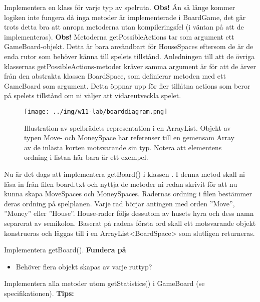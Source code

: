 \Subtask Implementera en klass för varje typ av spelruta. 
\newline
\newline
\noindent
\textbf{Obs!} Än så länge kommer logiken inte fungera då inga metoder är implementerade i BoardGame, det går trots detta bra att anropa metoderna utan kompileringsfel (i väntan på att de implementeras).
\newline
\newline
\noindent
\textbf{Obs!} Metoderna getPossibleActions tar som argument ett GameBoard-objekt. Detta är bara användbart för HouseSpaces eftersom de är de enda rutor som behöver känna till spelets tillstånd. Anledningen till att de övriga klassernas getPossibleActions-metoder kräver samma argument är för att de ärver från den abstrakta klassen BoardSpace, som definierar metoden med ett GameBoard som argument. Detta öppnar upp för fler tillåtna actions som beror på spelets tillstånd om ni väljer att vidareutveckla spelet.


\begin{figure}[H]
\centering
\texttt{[image: ../img/w11-lab/boarddiagram.png]}
\caption { Illustration av spelbrädets representation i en ArrayList. Objekt av typen Move- och MoneySpace har referenser till en gemensam Array av de inlästa korten motsvarande sin typ. Notera att elementens ordning i listan här bara är ett exempel.}
\label{fig:scalajava:lthopoly-team:boarddiagram}
\end{figure}

\Task Nu är det dags att implementera getBoard() i klassen . I denna metod skall ni läsa in från filen board.txt och nyttja de metoder ni redan skrivit för att nu kunna skapa MoveSpaces och MoneySpaces. Radernas ordning i filen bestämmer deras ordning på spelplanen. Varje rad börjar antingen med orden ''Move'', ''Money'' eller ''House''. House-rader följs dessutom av husets hyra och dess namn separerat av semikolon. Baserat på radens första ord skall ett motsvarande objekt konstrueras och läggas till i en ArrayList<BoardSpace> som slutligen returneras.

\Subtask Implementera getBoard().
\newline
\newline
\textbf{Fundera på}
\begin{itemize}
\item Behöver flera objekt skapas av varje ruttyp?
\end{itemize}

\Task Implementera alla metoder utom getStatistics() i GameBoard (se specifikationen).
\newline
\newline
\textbf{Tips:}

